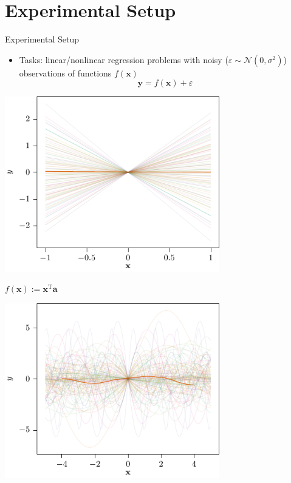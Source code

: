 \documentclass[aspectratio=169]{beamer}
\begin{document}
\section{Experimental Setup}
\begin{frame}{Experimental Setup}
  {
  \begin{minipage}{\textwidth}
    \begin{itemize}
      \item Tasks: linear/nonlinear regression problems with noisy ($\varepsilon  \sim \mathcal{N}(0, \sigma^2)$) observations of functions $f(\mathbf{x})$
      \begin{equation}\label{eq:task}
    \mathbf{y}= f(\mathbf{x})+\varepsilon
  \end{equation}  
    \end{itemize}
  \end{minipage}
  \begin{minipage}{\textwidth}
    \begin{minipage}{0.5\textwidth}
      \centering
      \includegraphics[width=0.7\textwidth]{figures/lin_maml}

    $f(\mathbf{x}):=\mathbf{x}^\text{T}\mathbf{a}$
    \end{minipage}%
    \begin{minipage}{0.5\textwidth}
      \centering
      \includegraphics[width=0.7\textwidth]{figures/nonlin_maml}


\end{minipage}
\end{minipage}}
\end{frame}
\end{document}
